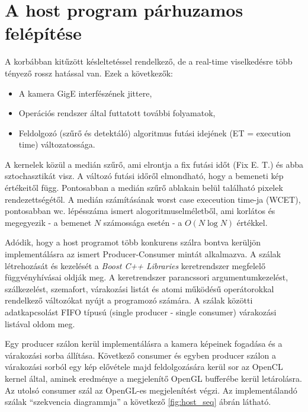 \section{A host program párhuzamos felépítése}
	A korbábban kitűzött késleltetéssel rendelkező, de a real-time viselkedésre több tényező rossz hatással van.
	Ezek a következők:
	\begin{itemize}
	  \item A kamera GigE interfészének jittere,
	  \item Operációs rendszer által futtatott további folyamatok,
	  \item Feldolgozó (szűrő és detektáló) algoritmus futási idejének (ET = execution time) változatossága. 
	\end{itemize}
	A kernelek közül a medián szűrő, ami elrontja a fix futási időt (Fix E. T.) és abba sztochasztikát visz.
	A változó futási időről elmondható, hogy a bemeneti kép értékeitől függ. Pontosabban a medián szűrő ablakain belül található
	pixelek rendezettségétől.
	A medián számításának worst case execeution time-ja (WCET), pontosabban wc. lépésszáma ismert alogoritmuselméletből, ami korlátos
	és megegyezik - a bemenet $N$ számossága esetén - a $O(N \log N)$  értékkel.
	
	Adódik, hogy a host programot több konkurens szálra bontva kerüljön implementálásra az ismert Producer-Consumer
	\cite{EWD:EWD329pub} mintát alkalmazva.
	\cbstart
	A szálak létrehozását és kezelését a \textit{Boost C++ Libraries} \cite{boost} keretrendszer
	megfelelő függvényhívásai oldják meg. A keretrendszer parancssori argumentumkezelést, szálkezelést, szemafort, várakozási
	listát és atomi működésű operátorokkal rendelkező változókat nyújt a programozó számára.
	\cbend
	A szálak közötti adatkapcsolást FIFO típusú (single producer - single consumer) várakozási listával oldom meg.
	
	Egy producer szálon kerül implementálásra a kamera képeinek fogadása és a várakozási sorba állítása. Következő consumer
	és egyben producer szálon a várakozási sorból egy kép elővétele majd feldolgozására kerül sor az OpenCL kernel által, aminek
	eredménye a megjelenítő OpenGL bufferébe kerül letárolásra. Az utolsó consumer szál az OpenGL-es megjelenítést végzi.
	Az implementálandó szálak ``szekvencia diagrammja'' a következő \ref{fig:host_seq} ábrán látható. 
	

